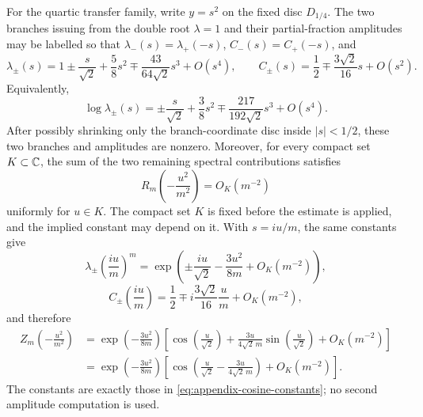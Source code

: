 \begin{proposition}\label{prop:endpoint-expansion}
For the quartic transfer family, write \(y=s^2\) on the fixed disc \(D_{1/4}\).  The two branches issuing from the double root \(\lambda=1\) and their partial-fraction amplitudes may be labelled so that \(\lambda_-(s)=\lambda_+(-s)\), \(C_-(s)=C_+(-s)\), and
\[
\lambda_\pm(s)
=
1\pm \frac{s}{\sqrt2}+\frac58s^2\mp\frac{43}{64\sqrt2}s^3+O(s^4),
\qquad
C_\pm(s)=\frac12\mp\frac{3\sqrt2}{16}s+O(s^2).
\]
Equivalently,
\begin{equation}\label{eq:log-lambda-plus-minus}
\log\lambda_\pm(s)=\pm\frac{s}{\sqrt2}+\frac38s^2\mp\frac{217}{192\sqrt2}s^3+O(s^4).
\end{equation}
After possibly shrinking only the branch-coordinate disc inside \(|s|<1/2\), these two branches and amplitudes are nonzero.
Moreover, for every compact set \(K\subset\mathbb{C}\), the sum of the two remaining spectral contributions satisfies
\begin{equation}\label{eq:appendix-remainder-bound-restated}
R_m\!\left(-\frac{u^2}{m^2}\right)=O_K(m^{-2})
\end{equation}
uniformly for \(u\in K\).  The compact set \(K\) is fixed before the estimate is applied, and the implied constant may depend on it.
With \(s=iu/m\), the same constants give
\begin{equation}\label{eq:lambda-power}
\lambda_\pm\!\left(\frac{iu}{m}\right)^m
=
\exp\!\left(
\pm \frac{iu}{\sqrt2}-\frac{3u^2}{8m}+O_K(m^{-2})
\right),
\end{equation}
\begin{equation}\label{eq:amplitude-scale}
C_\pm\!\left(\frac{iu}{m}\right)
=
\frac12\mp i\frac{3\sqrt2}{16}\frac{u}{m}+O_K(m^{-2}),
\end{equation}
and therefore
\begin{align}
Z_m\!\left(-\frac{u^2}{m^2}\right)
&=
\exp\!\left(-\frac{3u^2}{8m}\right)
\left[
\cos\!\left(\frac{u}{\sqrt2}\right)
+\frac{3u}{4\sqrt2\,m}\sin\!\left(\frac{u}{\sqrt2}\right)
+O_K(m^{-2})
\right]
\label{eq:appendix-scaling}\\
&=
\exp\!\left(-\frac{3u^2}{8m}\right)
\left[
\cos\!\left(\frac{u}{\sqrt2}-\frac{3u}{4\sqrt2\,m}\right)
+ O_K(m^{-2})
\right].\label{eq:appendix-shifted-cosine}
\end{align}
The constants are exactly those in \eqref{eq:appendix-cosine-constants}; no second amplitude computation is used.
\end{proposition}


